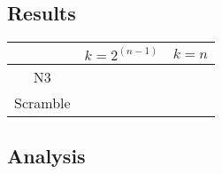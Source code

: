 \subsection{Results}
\label{Exp:Res}
\begin{table}[t]
  \begin{center}
    \begin{tabular}{c|c|c}\hline
               & $k=2^(n-1)$ & $k=n$ \\\hline
      N3       &             &       \\\hline
      Scramble &             &       \\\hline
    \end{tabular}
  \end{center}
\end{table}

\subsection{Analysis}
\label{Exp:An}
